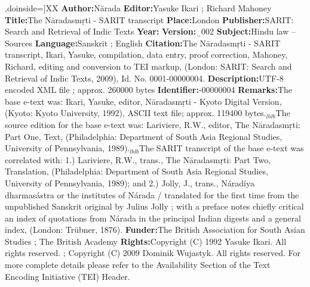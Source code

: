 \documentclass[article,12pt,a4paper]{memoir}%
\begin{document}
	  ,doinside=\small]{XX}{}{\toprule
    \textbf{Author:}\tabcellsep Nārada\tabularnewline
\textbf{Editor:}\tabcellsep Yasuke Ikari ; Richard Mahoney\tabularnewline
\textbf{Title:}\tabcellsep The Nāradasmṛti - SARIT transcript\tabularnewline
\textbf{Place:}\tabcellsep London\tabularnewline
\textbf{Publisher:}\tabcellsep SARIT: Search and Retrieval of Indic Texts\tabularnewline
\textbf{Year:}\tabularnewline
\textbf{Version:}‿002\tabularnewline
\textbf{Subject:}\tabcellsep Hindu law -- Sources\tabularnewline
\textbf{Language:}\tabcellsep Sanskrit ; English\tabularnewline
\textbf{Citation:}\tabcellsep The Nāradasmṛti - SARIT transcript, Ikari, Yasuke, compilation, data entry, proof correction, Mahoney, Richard, editing and conversion to TEI markup, (London: SARIT: Search and Retrieval of Indic Texts, 2009), Id. No. 0001-00000004.\tabularnewline
\textbf{Description:}\tabcellsep UTF-8 encoded XML file ; approx. 260000 bytes\tabularnewline
\textbf{Identifier:}-00000004\tabularnewline
\textbf{Remarks:}\tabcellsep The base e-text was: Ikari, Yasuke, editor, Nāradasmṛti - Kyoto Digital Version, (Kyoto: Kyoto University, 1992), ASCII text file; approx. 119400 bytes.{\tiny $_{lb}$}{\tiny $_{lb}$}The source edition for the base e-text was: Lariviere, R.W., editor, The Nāradasmṛti: Part One, Text, (Philadelphia: Department of South Asia Regional Studies, University of Pennsylvania, 1989).{\tiny $_{lb}$}{\tiny $_{lb}$}The SARIT transcript of the base e-text was correlated with: 1.) Lariviere, R.W., trans., The Nāradasmṛti: Part Two, Translation, (Philadelphia: Department of South Asia Regional Studies, University of Pennsylvania, 1989); and 2.) Jolly, J., trans., Náradíya dharmasástra or the institutes of Nárada / translated for the first time from the unpublished Sanskrit original by Julius Jolly ; with a preface notes chiefly critical an index of quotations from Nárada in the principal Indian digests and a general index, (London: Trübner, 1876).\tabularnewline
\textbf{Funder:}\tabcellsep The British Association for South Asian Studies ; The British Academy\tabularnewline
\textbf{Rights:}\tabcellsep Copyright (C) 1992 Yasuke Ikari. All rights reserved. ; Copyright (C) 2009 Dominik Wujastyk. All rights reserved. For more complete details please refer to the Availability Section of the Text Encoding Initiative (TEI) Header.\tabularnewline \bottomrule}
	
\end{document}
